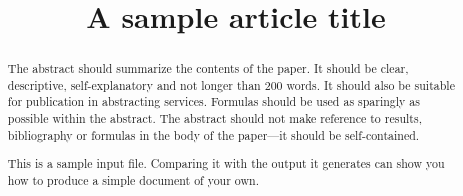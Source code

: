 \documentclass[aoas]{imsart}
\theoremstyle{plain}
\theoremstyle{remark}
\begin{document}
\begin{frontmatter}
\title{A sample article title}


\begin{abstract}
The abstract should summarize the contents of the paper.
It should be clear, descriptive, self-explanatory and not longer
than 200 words. It should also be suitable for publication in
abstracting services. Formulas should be used as sparingly as
possible within the abstract. The abstract should not make
reference to results, bibliography or formulas in the body
of the paper---it should be self-contained.

This is a sample input file.  Comparing it with the output it
generates can show you how to produce a simple document of
your own.
\end{abstract}

\begin{keyword}
\end{keyword}

\end{frontmatter}
\end{document}
